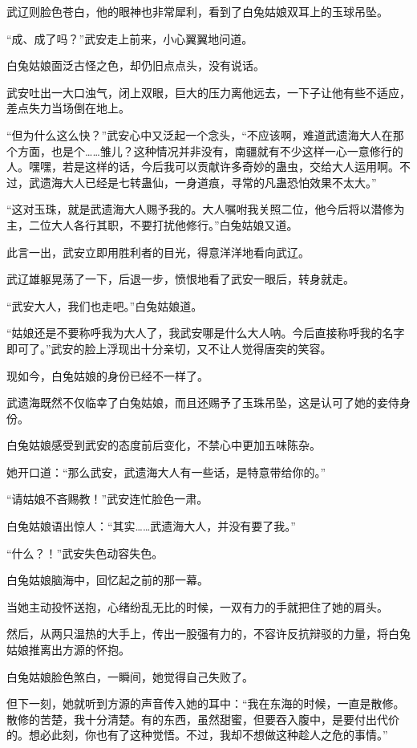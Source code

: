 \begin{this_body}
武辽则脸色苍白，他的眼神也非常犀利，看到了白兔姑娘双耳上的玉球吊坠。

“成、成了吗？”武安走上前来，小心翼翼地问道。

白兔姑娘面泛古怪之色，却仍旧点点头，没有说话。

武安吐出一大口浊气，闭上双眼，巨大的压力离他远去，一下子让他有些不适应，差点失力当场倒在地上。

“但为什么这么快？”武安心中又泛起一个念头，“不应该啊，难道武遗海大人在那个方面，也是个……雏儿？这种情况并非没有，南疆就有不少这样一心一意修行的人。嘿嘿，若是这样的话，今后我可以贡献许多奇妙的蛊虫，交给大人运用啊。不过，武遗海大人已经是七转蛊仙，一身道痕，寻常的凡蛊恐怕效果不太大。”

“这对玉珠，就是武遗海大人赐予我的。大人嘱咐我关照二位，他今后将以潜修为主，二位大人各行其职，不要打扰他修行。”白兔姑娘又道。

此言一出，武安立即用胜利者的目光，得意洋洋地看向武辽。

武辽雄躯晃荡了一下，后退一步，愤恨地看了武安一眼后，转身就走。

“武安大人，我们也走吧。”白兔姑娘道。

“姑娘还是不要称呼我为大人了，我武安哪是什么大人呐。今后直接称呼我的名字即可了。”武安的脸上浮现出十分亲切，又不让人觉得唐突的笑容。

现如今，白兔姑娘的身份已经不一样了。

武遗海既然不仅临幸了白兔姑娘，而且还赐予了玉珠吊坠，这是认可了她的妾侍身份。

白兔姑娘感受到武安的态度前后变化，不禁心中更加五味陈杂。

她开口道：“那么武安，武遗海大人有一些话，是特意带给你的。”

“请姑娘不吝赐教！”武安连忙脸色一肃。

白兔姑娘语出惊人：“其实……武遗海大人，并没有要了我。”

“什么？！”武安失色动容失色。

白兔姑娘脑海中，回忆起之前的那一幕。

当她主动投怀送抱，心绪纷乱无比的时候，一双有力的手就把住了她的肩头。

然后，从两只温热的大手上，传出一股强有力的，不容许反抗辩驳的力量，将白兔姑娘推离出方源的怀抱。

白兔姑娘脸色煞白，一瞬间，她觉得自己失败了。

但下一刻，她就听到方源的声音传入她的耳中：“我在东海的时候，一直是散修。散修的苦楚，我十分清楚。有的东西，虽然甜蜜，但要吞入腹中，是要付出代价的。想必此刻，你也有了这种觉悟。不过，我却不想做这种趁人之危的事情。”


\end{this_body}
